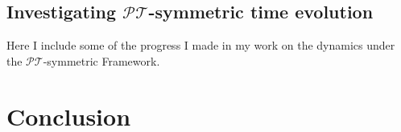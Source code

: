 \documentclass[12pt, a4paper]{report}
\newenvironment{Figure}
    {\par\medskip\noindent\minipage{\linewidth}}
    {\endminipage\par\medskip}
\newcommand\PT{\(\mathcal{PT}\)}
\begin{document}
\section{Investigating \PT-symmetric time evolution}
Here I include some of the progress I made in my work on the dynamics under the \PT-symmetric Framework. 










\chapter{Conclusion}\label{Conclusion}

\end{document}

